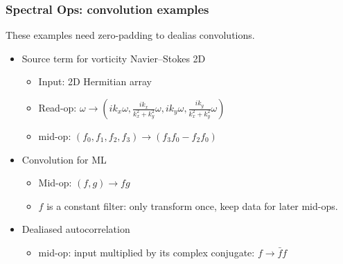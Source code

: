 \documentclass[10pt,aspectratio=169]{beamer}
\def\({\left(}
\def\){\right)}
\begin{document}
\begin{frame}
  \frametitle{Spectral Ops: convolution examples}

  These examples need zero-padding to dealias convolutions.
  
  \begin{itemize}

  \item Source term for vorticity Navier--Stokes 2D
    \begin{itemize}
      \item Input: 2D Hermitian array
      \item Read-op: $\omega \rightarrow
        \(
        ik_x\omega,
        \frac{ik_x}{k_x^2 + k_y^2}\omega,
        ik_y\omega,
        \frac{ik_y}{k_x^2 + k_y^2}\omega
        \)$
      \item mid-op: $\(f_0, f_1, f_2, f_3\) \rightarrow \( f_3 f_0 - f_2 f_0 \)$
    \end{itemize}
  \item Convolution for ML
    \begin{itemize}
    \item Mid-op: $\(f,g\)\rightarrow fg$
    \item $f$ is a constant filter: only transform once, keep data for later mid-ops.
    \end{itemize}
  \item Dealiased autocorrelation
    \begin{itemize}
    \item mid-op: input multiplied by its complex conjugate: $f \rightarrow \bar{f}f$
    \end{itemize}
  \end{itemize}
  
\end{frame}
\end{document}
